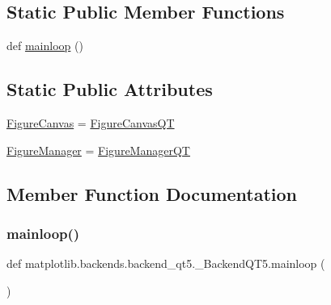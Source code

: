 \subsection*{Static Public Member Functions}
\begin{DoxyCompactItemize}
\item 
def \hyperlink{classmatplotlib_1_1backends_1_1backend__qt5_1_1__BackendQT5_af6c725c608dc3b66c4fb7f1adefde44a}{mainloop} ()
\end{DoxyCompactItemize}
\subsection*{Static Public Attributes}
\begin{DoxyCompactItemize}
\item 
\hyperlink{classmatplotlib_1_1backends_1_1backend__qt5_1_1__BackendQT5_a2734d2b4767415a1b2c340c549d6d8b2}{Figure\+Canvas} = \hyperlink{classmatplotlib_1_1backends_1_1backend__qt5_1_1FigureCanvasQT}{Figure\+Canvas\+QT}
\item 
\hyperlink{classmatplotlib_1_1backends_1_1backend__qt5_1_1__BackendQT5_a70006bdeb3716daa8cbf2b3ddf9484e3}{Figure\+Manager} = \hyperlink{classmatplotlib_1_1backends_1_1backend__qt5_1_1FigureManagerQT}{Figure\+Manager\+QT}
\end{DoxyCompactItemize}


\subsection{Member Function Documentation}
\mbox{\label{classmatplotlib_1_1backends_1_1backend__qt5_1_1__BackendQT5_af6c725c608dc3b66c4fb7f1adefde44a}} 
\subsubsection{\texorpdfstring{mainloop()}{mainloop()}}
{\footnotesize\ttfamily def matplotlib.\+backends.\+backend\+\_\+qt5.\+\_\+\+Backend\+Q\+T5.\+mainloop (\begin{DoxyParamCaption}{ }\end{DoxyParamCaption})\hspace{0.3cm}{\ttfamily [static]}}



